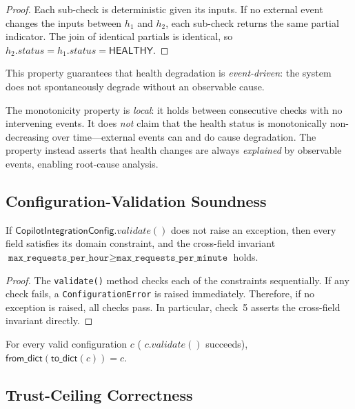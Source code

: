 \documentclass[11pt]{article}
\newcommand{\CIC}{\mathsf{CopilotIntegrationConfig}}
\begin{document}
\begin{proof}
Each sub-check is deterministic given its inputs.  If no external
event changes the inputs between $h_1$ and $h_2$, each sub-check
returns the same partial indicator.  The join of identical partials
is identical, so $h_2.\mathit{status} = h_1.\mathit{status}
= \mathsf{HEALTHY}$.
\end{proof}

This property guarantees that health degradation is
\emph{event-driven}: the system does not spontaneously degrade
without an observable cause.

\begin{remark}\label{rem:mono-scope}
The monotonicity property is \emph{local}: it holds between
consecutive checks with no intervening events.  It does \emph{not}
claim that the health status is monotonically non-decreasing over
time—external events can and do cause degradation.  The property
instead asserts that health changes are always \emph{explained} by
observable events, enabling root-cause analysis.
\end{remark}

\subsection{Configuration-Validation Soundness}

\begin{lemma}\label{lem:config-sound}
If $\CIC.\mathit{validate}()$ does not raise an exception,
then every field satisfies its domain constraint, and the
cross-field invariant
$\texttt{max\_requests\_per\_hour} \ge
\texttt{max\_requests\_per\_minute}$ holds.
\end{lemma}

\begin{proof}
The \texttt{validate()} method checks each of the
constraints sequentially.  If any
check fails, a \texttt{ConfigurationError} is raised immediately.
Therefore, if no exception is raised, all
checks pass.  In particular, check~5 asserts the cross-field
invariant directly.
\end{proof}

\begin{corollary}
\label{cor:roundtrip}
For every valid configuration $c$ (\ie{} $c.\mathit{validate}()$
succeeds), $\mathsf{from\_dict}(\mathsf{to\_dict}(c)) = c$.
\end{corollary}

\subsection{Trust-Ceiling Correctness}
\end{document}
